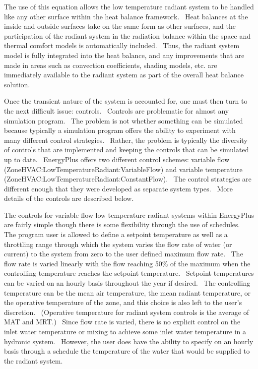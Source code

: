 The use of this equation allows the low temperature radiant system to be handled like any other surface within the heat balance framework.~ Heat balances at the inside and outside surfaces take on the same form as other surfaces, and the participation of the radiant system in the radiation balance within the space and thermal comfort models is automatically included.~ Thus, the radiant system model is fully integrated into the heat balance, and any improvements that are made in areas such as convection coefficients, shading models, etc. are immediately available to the radiant system as part of the overall heat balance solution.

Once the transient nature of the system is accounted for, one must then turn to the next difficult issue: controls.~ Controls are problematic for almost any simulation program.~ The problem is not whether something can be simulated because typically a simulation program offers the ability to experiment with many different control strategies.~ Rather, the problem is typically the diversity of controls that are implemented and keeping the controls that can be simulated up to date.~ EnergyPlus offers two different control schemes: variable flow (ZoneHVAC:LowTemperatureRadiant:VariableFlow) and variable temperature (ZoneHVAC:LowTemperatureRadiant:ConstantFlow).~ The control strategies are different enough that they were developed as separate system types.~ More details of the controls are described below.

The controls for variable flow low temperature radiant systems within EnergyPlus are fairly simple though there is some flexibility through the use of schedules.~ The program user is allowed to define a setpoint temperature as well as a throttling range through which the system varies the flow rate of water (or current) to the system from zero to the user defined maximum flow rate.~ The flow rate is varied linearly with the flow reaching 50\% of the maximum when the controlling temperature reaches the setpoint temperature.~ Setpoint temperatures can be varied on an hourly basis throughout the year if desired.~ The controlling temperature can be the mean air temperature, the mean radiant temperature, or the operative temperature of the zone, and this choice is also left to the user's discretion.~ (Operative temperature for radiant system controls is the average of MAT and MRT.)~ Since flow rate is varied, there is no explicit control on the inlet water temperature or mixing to achieve some inlet water temperature in a hydronic system.~ However, the user does have the ability to specify on an hourly basis through a schedule the temperature of the water that would be supplied to the radiant system.


